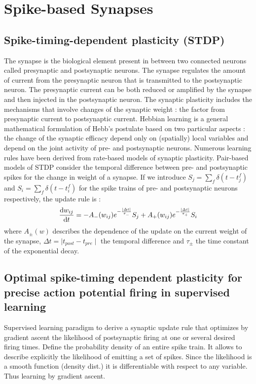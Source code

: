 \documentclass[12pt]{article}
\begin{document}
\section{Spike-based Synapses}

\subsection{Spike-timing-dependent plasticity (STDP) \cite{gerstner2014neuronal}}
The synapse is the biological element present in between two connected neurons called presynaptic and postsynaptic neurons. The synapse regulates the amount of current from the presynaptic neuron that is transmitted to the postsynaptic neuron. The presynaptic current can be both reduced or amplified by the synapse and then injected in the postsynaptic neuron. The synaptic plasticity includes the mechanisms that involve changes of the synaptic weight : the factor from presynaptic current to postsynaptic current.
Hebbian learning is a general mathematical formulation of Hebb's postulate based on two particular aspects : the change of the synaptic efficacy depend only on (spatially) local variables and depend on the joint activity of pre- and postsynaptic neurons. Numerous learning rules have been derived from rate-based models of synaptic plasticity. Pair-based models of STDP consider the temporal difference between pre- and postsynaptic spikes for the change in weight of a synapse. If we introduce $S_j = \sum_f \delta(t-t^f_j)$ and $S_i = \sum_f \delta(t-t^f_i)$ for the spike trains of pre- and postsynaptic neurons respectively, the update rule is : 
\begin{equation}
\frac{\textnormal{d} w_{ij}}{\textnormal{d}t} =
- A_- (w_{ij}) e^{- \frac{\mid \Delta t \mid}{\tau_-}} S_j + 
A_+ (w_{ij}) e^{- \frac{\mid \Delta t \mid}{\tau_+}} S_i
\end{equation}
where $A_{\pm}(w)$ describes the dependence of the update on the current weight of the synapse, $\Delta t = \mid t_{post}-t_{pre} \mid$ the temporal difference and $\tau_\pm$ the time constant of the exponential decay.

\subsection{Optimal spike-timing dependent plasticity for precise action potential firing in supervised learning \cite{pfister2006optimal}}

Supervised learning paradigm to derive a synaptic update rule that optimizes by gradient ascent the likelihood of postsynaptic firing at one or several desired firing times.
Define the probability density of an entire spike train. It allows to describe explicitly the likelihood of emitting a set of spikes. Since the likelihood is a smooth function (density dist.) it is differentiable with respect to any variable. Thus learning by gradient ascent.
\end{document}
